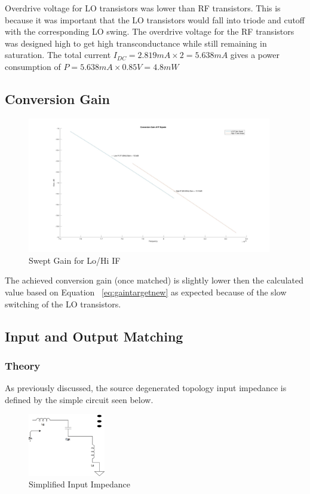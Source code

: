 \documentclass{article}                                                         %
\begin{document}
Overdrive voltage for LO transistors was lower than RF transistors. This is because it was important
that the LO transistors would fall into triode and cutoff with the corresponding LO swing. The overdrive
voltage for the RF transistors was designed high to get high transconductance while still remaining in saturation.
The total current $I_{DC} = 2.819mA \times 2 = 5.638mA$ gives a power consumption of $P = 5.638mA \times 0.85V = 4.8mW$


\subsection{Conversion Gain}
\begin{figure}[H]
  \centering
  \includegraphics[width=0.95\textwidth] {Plots/Gain.jpg}
  \caption{Swept Gain for Lo/Hi IF}
    \label{fig:matgain}
\end{figure}
The achieved conversion gain (once matched) is slightly lower then the calculated value based on Equation
~\ref{eq:gaintargetnew} as expected because of the slow switching of the LO transistors.

\subsection{Input and Output Matching}\label{sec:matching}
\subsubsection{Theory}
As previously discussed, the source degenerated topology input impedance is defined by the
simple circuit seen below.

\begin{figure}[H]
  \centering
  \includegraphics[width=0.3\textwidth] {Figures/zin}
  \caption{Simplified Input Impedance}
    \label{fig:zinSimple}
\end{figure}
\end{document}
